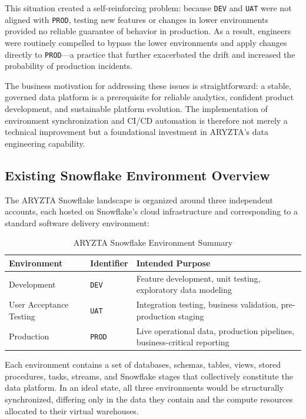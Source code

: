 This situation created a self-reinforcing problem: because \texttt{DEV} and \texttt{UAT} were not aligned with \texttt{PROD}, testing new features or changes in lower environments provided no reliable guarantee of behavior in production. As a result, engineers were routinely compelled to bypass the lower environments and apply changes directly to \texttt{PROD}---a practice that further exacerbated the drift and increased the probability of production incidents.

The business motivation for addressing these issues is straightforward: a stable, governed data platform is a prerequisite for reliable analytics, confident product development, and sustainable platform evolution. The implementation of environment synchronization and CI/CD automation is therefore not merely a technical improvement but a foundational investment in ARYZTA's data engineering capability.

\subsection{Existing Snowflake Environment Overview}
\label{subsec:existing-env}

The ARYZTA Snowflake landscape is organized around three independent accounts, each hosted on Snowflake's cloud infrastructure and corresponding to a standard software delivery environment:

\begin{table}[H]
  \centering
  \begin{tabularx}{\textwidth}{l l X}
    \toprule
    \rowcolor{ibmblue!15}
    \textbf{Environment} & \textbf{Identifier} & \textbf{Intended Purpose} \\
    \midrule
    Development    & \texttt{DEV}  & Feature development, unit testing, exploratory data modeling \\
    User Acceptance Testing & \texttt{UAT} & Integration testing, business validation, pre-production staging \\
    Production     & \texttt{PROD} & Live operational data, production pipelines, business-critical reporting \\
    \bottomrule
  \end{tabularx}
  \caption{ARYZTA Snowflake Environment Summary}
  \label{tab:env-summary}
\end{table}

Each environment contains a set of databases, schemas, tables, views, stored procedures, tasks, streams, and Snowflake stages that collectively constitute the data platform. In an ideal state, all three environments would be structurally synchronized, differing only in the data they contain and the compute resources allocated to their virtual warehouses.

